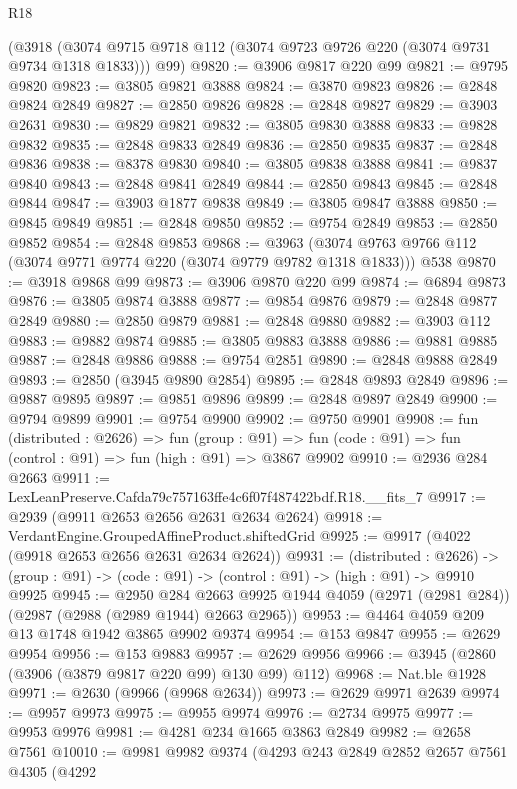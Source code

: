 \begin{lexlean}{R18}
\begin{coremodule}
    (@3918 (@3074 @9715 @9718 @112 (@3074 @9723 @9726 @220 (@3074 @9731 @9734 @1318 @1833))) @99)
@9820 := @3906 @9817 @220 @99
@9821 := @9795 @9820
@9823 := @3805 @9821 @3888
@9824 := @3870 @9823
@9826 := @2848 @9824 @2849
@9827 := @2850 @9826
@9828 := @2848 @9827
@9829 := @3903 @2631
@9830 := @9829 @9821
@9832 := @3805 @9830 @3888
@9833 := @9828 @9832
@9835 := @2848 @9833 @2849
@9836 := @2850 @9835
@9837 := @2848 @9836
@9838 := @8378 @9830
@9840 := @3805 @9838 @3888
@9841 := @9837 @9840
@9843 := @2848 @9841 @2849
@9844 := @2850 @9843
@9845 := @2848 @9844
@9847 := @3903 @1877 @9838
@9849 := @3805 @9847 @3888
@9850 := @9845 @9849
@9851 := @2848 @9850
@9852 := @9754 @2849
@9853 := @2850 @9852
@9854 := @2848 @9853
@9868 := @3963
    (@3074 @9763 @9766 @112 (@3074 @9771 @9774 @220 (@3074 @9779 @9782 @1318 @1833)))
    @538
@9870 := @3918 @9868 @99
@9873 := @3906 @9870 @220 @99
@9874 := @6894 @9873
@9876 := @3805 @9874 @3888
@9877 := @9854 @9876
@9879 := @2848 @9877 @2849
@9880 := @2850 @9879
@9881 := @2848 @9880
@9882 := @3903 @112
@9883 := @9882 @9874
@9885 := @3805 @9883 @3888
@9886 := @9881 @9885
@9887 := @2848 @9886
@9888 := @9754 @2851
@9890 := @2848 @9888 @2849
@9893 := @2850 (@3945 @9890 @2854)
@9895 := @2848 @9893 @2849
@9896 := @9887 @9895
@9897 := @9851 @9896
@9899 := @2848 @9897 @2849
@9900 := @9794 @9899
@9901 := @9754 @9900
@9902 := @9750 @9901
@9908 := fun (distributed : @2626) =>
  fun (group : @91) => fun (code : @91) => fun (control : @91) => fun (high : @91) => @3867 @9902
@9910 := @2936 @284 @2663
@9911 := LexLeanPreserve.Cafda79c757163ffe4c6f07f487422bdf.R18.__fits_7
@9917 := @2939 (@9911 @2653 @2656 @2631 @2634 @2624)
@9918 := VerdantEngine.GroupedAffineProduct.shiftedGrid
@9925 := @9917 (@4022 (@9918 @2653 @2656 @2631 @2634 @2624))
@9931 := (distributed : @2626) ->
  (group : @91) -> (code : @91) -> (control : @91) -> (high : @91) -> @9910 @9925
@9945 := @2950
    @284
    @2663
    @9925
    @1944
    @4059
    (@2971 (@2981 @284))
    (@2987 (@2988 (@2989 @1944) @2663 @2965))
@9953 := @4464 @4059 @209 @13 @1748 @1942 @3865 @9902 @9374
@9954 := @153 @9847
@9955 := @2629 @9954
@9956 := @153 @9883
@9957 := @2629 @9956
@9966 := @3945 (@2860 (@3906 (@3879 @9817 @220 @99) @130 @99) @112)
@9968 := Nat.ble @1928
@9971 := @2630 (@9966 (@9968 @2634))
@9973 := @2629 @9971 @2639
@9974 := @9957 @9973
@9975 := @9955 @9974
@9976 := @2734 @9975
@9977 := @9953 @9976
@9981 := @4281 @234 @1665 @3863 @2849
@9982 := @2658 @7561
@10010 := @9981
    @9982
    @9374
    (@4293
      @243
      @2849
      @2852
      @2657
      @7561
      @4305
      (@4292

\end{coremodule}
\end{lexlean}
